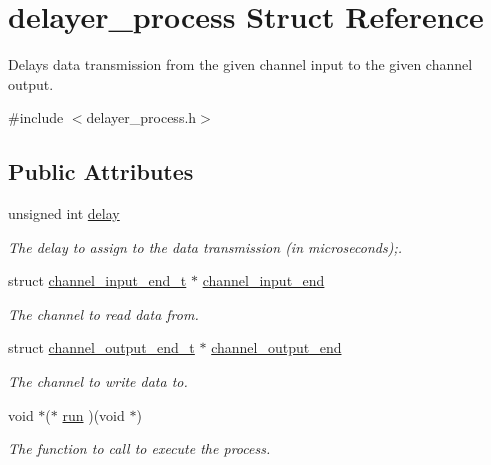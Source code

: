 \hypertarget{structdelayer__process}{\section{delayer\-\_\-process Struct Reference}
\label{structdelayer__process}
}


Delays data transmission from the given channel input to the given channel output.  




{\ttfamily \#include $<$delayer\-\_\-process.\-h$>$}

\subsection*{Public Attributes}
\begin{DoxyCompactItemize}
\item 
\hypertarget{structdelayer__process_a3ea1248253662aa880492b428bbd46ef}{unsigned int \hyperlink{structdelayer__process_a3ea1248253662aa880492b428bbd46ef}{delay}}\label{structdelayer__process_a3ea1248253662aa880492b428bbd46ef}

\begin{DoxyCompactList}\small\item\em The delay to assign to the data transmission (in microseconds);. \end{DoxyCompactList}\item 
\hypertarget{structdelayer__process_a05506c000fbcb4451598ef5e3c79d52b}{struct \hyperlink{structchannel__input__end__t}{channel\-\_\-input\-\_\-end\-\_\-t} $\ast$ \hyperlink{structdelayer__process_a05506c000fbcb4451598ef5e3c79d52b}{channel\-\_\-input\-\_\-end}}\label{structdelayer__process_a05506c000fbcb4451598ef5e3c79d52b}

\begin{DoxyCompactList}\small\item\em The channel to read data from. \end{DoxyCompactList}\item 
\hypertarget{structdelayer__process_a6f5522eefb36a3010ecee1e7e17f56b8}{struct \hyperlink{structchannel__output__end__t}{channel\-\_\-output\-\_\-end\-\_\-t} $\ast$ \hyperlink{structdelayer__process_a6f5522eefb36a3010ecee1e7e17f56b8}{channel\-\_\-output\-\_\-end}}\label{structdelayer__process_a6f5522eefb36a3010ecee1e7e17f56b8}

\begin{DoxyCompactList}\small\item\em The channel to write data to. \end{DoxyCompactList}\item 
\hypertarget{structdelayer__process_a0510dcdd3532d00f163647a9b7b723ba}{void $\ast$($\ast$ \hyperlink{structdelayer__process_a0510dcdd3532d00f163647a9b7b723ba}{run} )(void $\ast$)}\label{structdelayer__process_a0510dcdd3532d00f163647a9b7b723ba}

\begin{DoxyCompactList}\small\item\em The function to call to execute the process. \end{DoxyCompactList}\end{DoxyCompactItemize}


